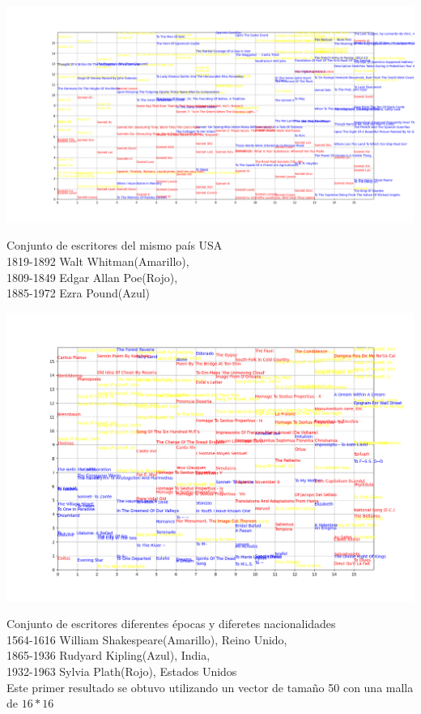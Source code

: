 \documentclass[a4paper, 11pt, oneside]{article}
\begin{document}
\begin{center}
    \includegraphics[scale=0.15]{Imagenes/2.png}
\end{center}
Conjunto de escritores del mismo país USA\\
1819-1892 Walt Whitman(Amarillo),\\
1809-1849 Edgar Allan Poe(Rojo),\\
1885-1972 Ezra Pound(Azul)
\begin{center}
    \includegraphics[scale=0.20]{Imagenes/3.png}
\end{center}
Conjunto de escritores diferentes épocas y diferetes nacionalidades\\
1564-1616 William Shakespeare(Amarillo), Reino Unido,\\
1865-1936 Rudyard Kipling(Azul), India,\\
1932-1963 Sylvia Plath(Rojo), Estados Unidos\\
Este primer resultado se obtuvo utilizando un vector de tamaño 50 con una malla de $16*16$
\end{document}
